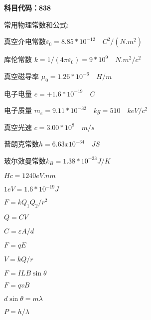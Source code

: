 
\textbf{科目代码：838}

常用物理常数和公式:

真空介电常数$\varepsilon_0=8.85 *10^{-12} \quad C^2/(N.m^2)$

库伦常数 $k=1/(4\pi \varepsilon_0)=9*10^9 \quad N.m^2/c^2$

真空磁导率 $\mu_0=1.26*10^{-6}\quad H/m$

电子电量 $e=+1.6*10^{-19}\quad C$

电子质量 $m_e=9.11*10^{-32}\quad kg=510 \quad keV/c^2$

真空光速 $c=3.00* 10^8 \quad m/s$

普朗克常数$h=6.63x10^{-34}\quad JS$

玻尔效曼常数$k_B =1.38*10^{-23}J/K$

$Hc=1240 eV.nm$

$1 eV=1.6*10^{-19}J$

$F=k Q_1 Q_2/r^2$

$Q=CV$

$C=\varepsilon A/d$

$F=qE$

$V=kQ/r$

$F=ILB\sin \theta$

$F=qvB$

$d\sin \theta =m\lambda $

$P=h/\lambda$

